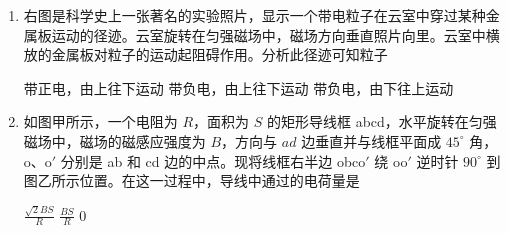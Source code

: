 \documentclass[\gkver]{gaokaozhenti}
\begin{document}
\begin{enumerate}
{由于只有电场力做功，所以只有电势能与动能的相互转化，故电势能与机械能之和守恒，C 错；

由 b 到 O 电场力做正功，电势能减小，由 O 到 d 电场力做负功，电势能增加，D 对。

}

\item
右图是科学史上一张著名的实验照片，显示一个带电粒子在云室中穿过某种金属板运动的径迹。云室旋转在匀强磁场中，磁场方向垂直照片向里。云室中横放的金属板对粒子的运动起阻碍作用。分析此径迹可知粒子


{带正电，由上往下运动}
{带负电，由上往下运动}
{带负电，由下往上运动}


\item
如图甲所示，一个电阻为 $R$，面积为 $S$ 的矩形导线框 abcd，水平旋转在匀强磁场中，磁场的磁感应强度为 $B$，方向与 $ad$ 边垂直并与线框平面成 $45^\circ$ 角，o、o$'$ 分别是 ab 和 cd 边的中点。现将线框右半边 obco$'$ 绕 oo$'$ 逆时针 $90^\circ$ 到图乙所示位置。在这一过程中，导线中通过的电荷量是


{$\frac{\sqrt{2}BS}{R}$}
{$\frac{BS}{R}$}
{0}



\end{enumerate}
\end{document}
